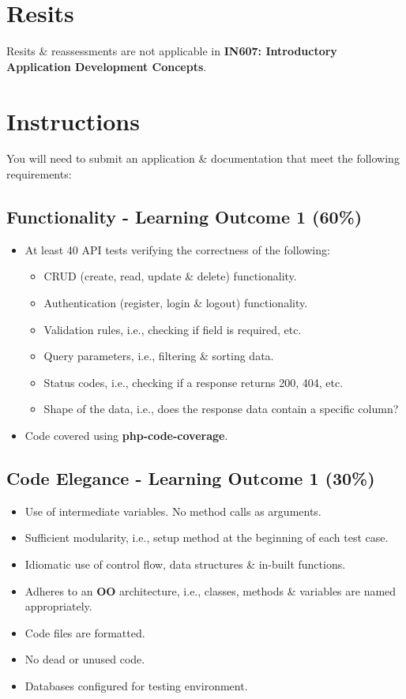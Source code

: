 \documentclass{article}
\begin{document}
\section*{Resits}
Resits \& reassessments are not applicable in \textbf{IN607: Introductory Application Development Concepts}. 

\newpage

\section*{Instructions}
You will need to submit an application \& documentation that meet the following requirements:

\subsection*{Functionality - Learning Outcome 1 (60\%)}
\begin{itemize}
    \item At least 40 API tests verifying the correctness of the following:
    \begin{itemize}
        \item CRUD (create, read, update \& delete) functionality.
        \item Authentication (register, login \& logout) functionality.
        \item Validation rules, i.e., checking if field is required, etc.
        \item Query parameters, i.e., filtering \& sorting data.
        \item Status codes, i.e., checking if a response returns 200, 404, etc.
        \item Shape of the data, i.e., does the response data contain a specific column?
    \end{itemize}
  \item Code covered using \textbf{php-code-coverage}.
\end{itemize}

\subsection*{Code Elegance - Learning Outcome 1 (30\%)}
\begin{itemize}
    \item Use of intermediate variables. No method calls as arguments.
    \item Sufficient modularity, i.e., setup method at the beginning of each test case.
    \item Idiomatic use of control flow, data structures \& in-built functions.
    \item Adheres to an \textbf{OO} architecture, i.e., classes, methods \& variables are named appropriately.
    \item Code files are formatted.
    \item No dead or unused code.
    \item Databases configured for testing environment.
\end{itemize}
\end{document}
